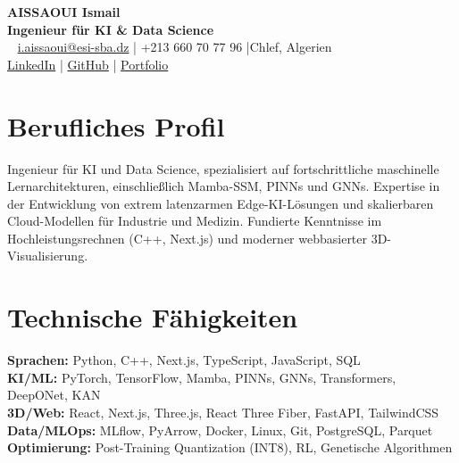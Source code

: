 \documentclass[a4paper,10pt]{article}
\begin{document}
\sloppy

\begin{center}
    {\Huge\bfseries\color{titleblue} AISSAOUI Ismail}\\[1pt]
    {\LARGE\bfseries Ingenieur für KI \& Data Science}\\\  %
    {    \href{mailto:i.aissaoui@esi-sba.dz}{i.aissaoui@esi-sba.dz} \quad|\quad
    +213 660 70 77 96 \quad|\quad Chlef, Algerien \\  %
    \href{https://linkedin.com/in/aissaoui-ismail-6a77a92a7}{LinkedIn} \quad|\quad
    \href{https://github.com/i-aissaoui}{GitHub} \quad|\quad
    \href{https://ismail-aissaoui.vercel.app}{Portfolio}
    }
\end{center}

\section{Berufliches Profil}
Ingenieur für KI und Data Science, spezialisiert auf fortschrittliche maschinelle Lernarchitekturen, einschließlich Mamba-SSM, PINNs und GNNs. Expertise in der Entwicklung von extrem latenzarmen Edge-KI-Lösungen und skalierbaren Cloud-Modellen für Industrie und Medizin. Fundierte Kenntnisse im Hochleistungsrechnen (C++, Next.js) und moderner webbasierter 3D-Visualisierung.

\section{Technische Fähigkeiten}
\textbf{Sprachen:} Python, C++, Next.js, TypeScript, JavaScript, SQL \\
\textbf{KI/ML:} PyTorch, TensorFlow, Mamba, PINNs, GNNs, Transformers, DeepONet, KAN \\
\textbf{3D/Web:} React, Next.js, Three.js, React Three Fiber, FastAPI, TailwindCSS \\
\textbf{Data/MLOps:} MLflow, PyArrow, Docker, Linux, Git, PostgreSQL, Parquet \\
\textbf{Optimierung:} Post-Training Quantization (INT8), RL, Genetische Algorithmen
\end{document}
